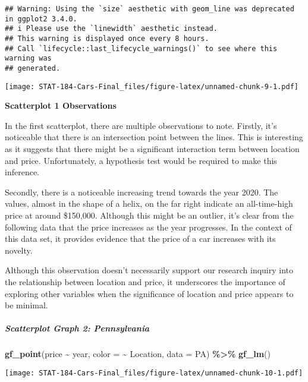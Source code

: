 \documentclass[
]{article}
\newenvironment{Shaded}{\begin{snugshade}}{\end{snugshade}}
\newcommand{\AttributeTok}[1]{\textcolor[rgb]{0.13,0.29,0.53}{#1}}
\newcommand{\FunctionTok}[1]{\textcolor[rgb]{0.13,0.29,0.53}{\textbf{#1}}}
\newcommand{\NormalTok}[1]{#1}
\newcommand{\SpecialCharTok}[1]{\textcolor[rgb]{0.81,0.36,0.00}{\textbf{#1}}}
\begin{document}
\begin{verbatim}
## Warning: Using the `size` aesthetic with geom_line was deprecated in ggplot2 3.4.0.
## i Please use the `linewidth` aesthetic instead.
## This warning is displayed once every 8 hours.
## Call `lifecycle::last_lifecycle_warnings()` to see where this warning was
## generated.
\end{verbatim}

\texttt{[image: STAT-184-Cars-Final\_files/figure-latex/unnamed-chunk-9-1.pdf]}

\textbf{Scatterplot 1 Observations}

In the first scatterplot, there are multiple observations to note.
Firstly, it's noticeable that there is an intersection point between the
lines. This is interesting as it suggests that there might be a
significant interaction term between location and price. Unfortunately,
a hypothesis test would be required to make this inference.

Secondly, there is a noticeable increasing trend towards the year 2020.
The values, almost in the shape of a helix, on the far right indicate an
all-time-high price at around \$150,000. Although this might be an
outlier, it's clear from the following data that the price increases as
the year progresses. In the context of this data set, it provides
evidence that the price of a car increases with its novelty.

Although this observation doesn't necessarily support our research
inquiry into the relationship between location and price, it underscores
the importance of exploring other variables when the significance of
location and price appears to be minimal.

\hypertarget{scatterplot-graph-2-pennsylvania}{%
\subparagraph{Scatterplot Graph 2:
Pennsylvania}\label{scatterplot-graph-2-pennsylvania}}

\begin{Shaded}
\begin{Highlighting}[]
\FunctionTok{gf\_point}\NormalTok{(price }\SpecialCharTok{\textasciitilde{}}\NormalTok{ year, }\AttributeTok{color =} \SpecialCharTok{\textasciitilde{}}\NormalTok{ Location, }\AttributeTok{data =}\NormalTok{ PA) }\SpecialCharTok{\%\textgreater{}\%}
  \FunctionTok{gf\_lm}\NormalTok{()}
\end{Highlighting}
\end{Shaded}

\texttt{[image: STAT-184-Cars-Final\_files/figure-latex/unnamed-chunk-10-1.pdf]}
\end{document}
